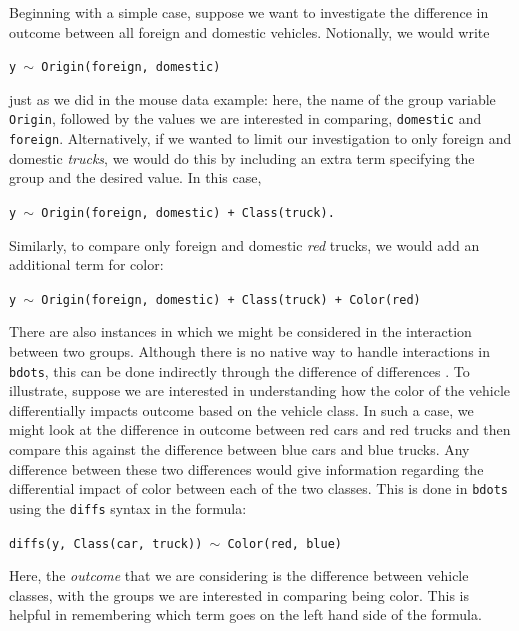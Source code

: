 \documentclass{article}
\newcommand{\xt}{\texttt}%
\begin{document}
Beginning with a simple case, suppose we want to investigate the difference in outcome between all foreign and domestic vehicles. Notionally, we would write

\begin{center}
\tt y $\sim$ Origin(foreign, domestic)
\end{center}

just as we did in the mouse data example: here, the name of the group variable \xt{Origin}, followed by the values we are interested in comparing, \xt{domestic} and \xt{foreign}. Alternatively, if we wanted to limit our investigation to only foreign and domestic \textit{trucks}, we would do this by including an extra term specifying the group and the desired value. In this case, 

\begin{center}
\tt y $\sim$ Origin(foreign, domestic) + Class(truck).
\end{center}

Similarly, to compare only foreign and domestic \textit{red} trucks, we would add an additional term for color:

\begin{center}
\tt y $\sim$ Origin(foreign, domestic) + Class(truck) + Color(red)
\end{center}

There are also instances in which we might be considered in the interaction between two groups. Although there is no native way to handle interactions in \xt{bdots}, this can be done indirectly through the difference of differences \cite{McMurray2019}. To illustrate, suppose we are interested in understanding how the color of the vehicle differentially impacts outcome based on the vehicle class. In such a case, we might look at the difference in outcome between red cars and red trucks and then compare this against the difference between blue cars and blue trucks. Any difference between these two differences would give information regarding the differential impact of color between each of the two classes. This is done in \xt{bdots} using the \xt{diffs} syntax in the formula:


\begin{center}
\tt diffs(y, Class(car, truck)) $\sim$ Color(red, blue)
\end{center}

Here, the \textit{outcome} that we are considering is the difference between vehicle classes, with the groups we are interested in comparing being color. This is helpful in remembering which term goes on the left hand side of the formula. 
\end{document}
